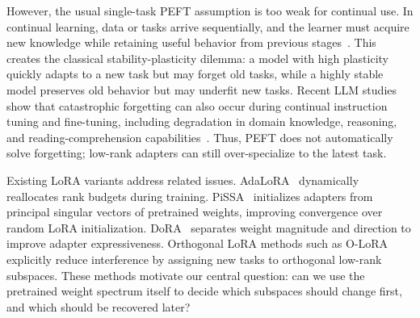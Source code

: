 \documentclass[11pt]{article}
\begin{document}
However, the usual single-task PEFT assumption is too weak for continual use. In continual learning, data or tasks arrive sequentially, and the learner must acquire new knowledge while retaining useful behavior from previous stages~\cite{wang2024comprehensivecl,ke2023continualnlp}. This creates the classical stability-plasticity dilemma: a model with high plasticity quickly adapts to a new task but may forget old tasks, while a highly stable model preserves old behavior but may underfit new tasks. Recent LLM studies show that catastrophic forgetting can also occur during continual instruction tuning and fine-tuning, including degradation in domain knowledge, reasoning, and reading-comprehension capabilities~\cite{luo2023empiricalforgetting,weng2024continualllm}. Thus, PEFT does not automatically solve forgetting; low-rank adapters can still over-specialize to the latest task.

Existing LoRA variants address related issues. AdaLoRA~\cite{zhang2023adalora} dynamically reallocates rank budgets during training. PiSSA~\cite{meng2024pissa} initializes adapters from principal singular vectors of pretrained weights, improving convergence over random LoRA initialization. DoRA~\cite{liu2024dora} separates weight magnitude and direction to improve adapter expressiveness. Orthogonal LoRA methods such as O-LoRA~\cite{wang2023olora} explicitly reduce interference by assigning new tasks to orthogonal low-rank subspaces. These methods motivate our central question: can we use the pretrained weight spectrum itself to decide which subspaces should change first, and which should be recovered later?
\end{document}
